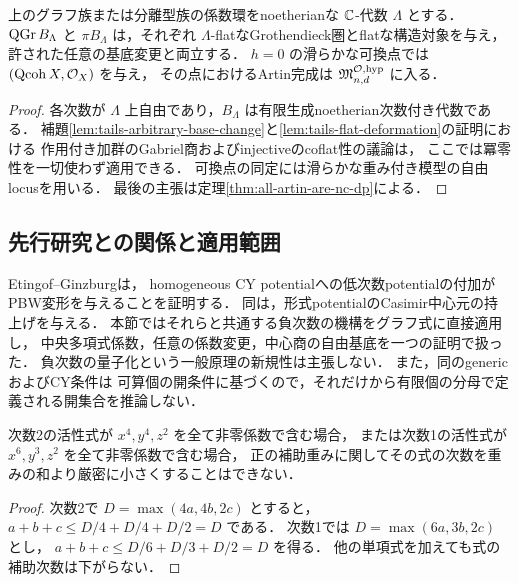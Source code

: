 \begin{proposition}[有限型の平坦Abel族]
\label{prop:finite-pbw-abel-family}
上のグラフ族または分離型族の係数環をnoetherianな $\mathbb C$-代数 $\Lambda$ とする．
$\operatorname{QGr} B_\Lambda$ と $\pi B_\Lambda$ は，それぞれ
$\Lambda$-flatなGrothendieck圏とflatな構造対象を与え，
許された任意の基底変更と両立する．
$h=0$ の滑らかな可換点では $(\operatorname{Qcoh} X,\mathcal O_X)$ を与え，
その点におけるArtin完成は $\mathfrak M^{\mathcal O,\mathrm{hyp}}_{n,d}$ に入る．
\end{proposition}
\begin{proof}
各次数が $\Lambda$ 上自由であり，$B_\Lambda$ は有限生成noetherian次数付き代数である．
補題\ref{lem:tails-arbitrary-base-change}と\ref{lem:tails-flat-deformation}の証明における
作用付き加群のGabriel商およびinjectiveのcoflat性の議論は，
ここでは冪零性を一切使わず適用できる．
可換点の同定には滑らかな重み付き模型の自由locusを用いる．
最後の主張は定理\ref{thm:all-artin-are-nc-dp}による．
\end{proof}

\subsection{先行研究との関係と適用範囲}

\begin{remark}[既存のfiltered量子化との関係]
Etingof--Ginzburg\cite[Proposition~7.3.1(ii), Corollary~7.4.1(ii)]{EG2010}は，
homogeneous CY potentialへの低次数potentialの付加がPBW変形を与えることを証明する．
同\cite[Proposition~8.1.1(i)]{EG2010}は，形式potentialのCasimir中心元の持上げを与える．
本節ではそれらと共通する負次数の機構をグラフ式に直接適用し，
中央多項式係数，任意の係数変更，中心商の自由基底を一つの証明で扱った．
負次数の量子化という一般原理の新規性は主張しない．
また，同\cite[Definition~3.4.3, Lemma~7.1.5]{EG2010}のgenericおよびCY条件は
可算個の開条件に基づくので，それだけから有限個の分母で定義される開集合を推論しない．
\end{remark}

\begin{proposition}[一般の楕円的最高次項に対する補助重みの障害]
\label{prop:elliptic-top-auxiliary-obstruction}
次数2の活性式が $x^4,y^4,z^2$ を全て非零係数で含む場合，
または次数1の活性式が $x^6,y^3,z^2$ を全て非零係数で含む場合，
正の補助重みに関してその式の次数を重みの和より厳密に小さくすることはできない．
\end{proposition}

\begin{proof}
次数2で $D=\max(4a,4b,2c)$ とすると，
$a+b+c\le D/4+D/4+D/2=D$ である．
次数1では $D=\max(6a,3b,2c)$ とし，
$a+b+c\le D/6+D/3+D/2=D$ を得る．
他の単項式を加えても式の補助次数は下がらない．
\end{proof}

